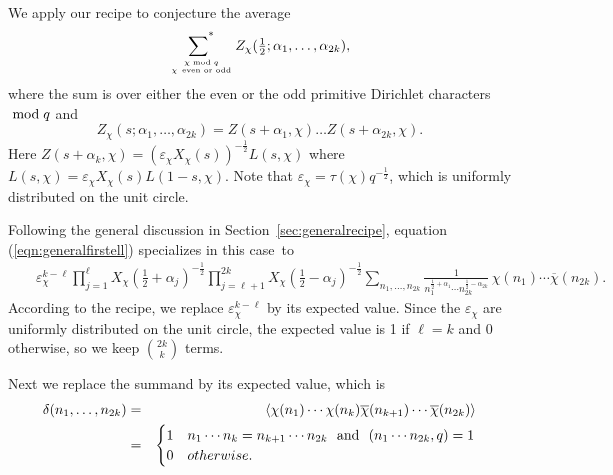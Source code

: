 \documentclass[12pt,letterpaper]{amsart}
\theoremstyle{plain}
\theoremstyle{definition}
\theoremstyle{remark}
\numberwithin{equation}{subsection}
\numberwithin{theorem}{subsection}
\numberwithin{table}{subsection}
\newcommand{\ontop}[2]{\genfrac{}{}{0pt}{}{#1}{#2}}
\renewcommand{\mod}{\bmod}
\def\sumstar{\operatornamewithlimits{\sum\nolimits^*}}
\begin{document}
We apply our recipe to conjecture the average
\begin{equation}
 \sumstar_{\ontop{\chi\mod q}{\chi\ \text{even or odd}}}
Z_\chi(\tfrac12;\alpha_1,\dots,\alpha_{2k}) ,
\end{equation}
where the sum is over either the even or the odd
 primitive Dirichlet characters $\mathstrut\mod q$
and
\begin{equation}
Z_\chi(s;\alpha_1,\dots,\alpha_{2k})=
 Z(s +\alpha_1,\chi)\dots
Z(s +\alpha_{2k},\chi)
.
\end{equation}
Here $Z(s +\alpha_k,\chi) = (\varepsilon_\chi X_\chi (s) )^{-\frac12} L(s, \chi)$
where $L(s, \chi)=\varepsilon_\chi X_\chi(s) L(1-s,\chi)$.
Note that $\varepsilon_\chi=\tau(\chi)q^{-\frac12}$,
which is uniformly distributed on the unit circle.

Following the general discussion in Section~\ref{sec:generalrecipe},
equation (\ref{eqn:generalfirstell}) specializes in this case~to
\begin{eqnarray}
&   & 
\varepsilon_\chi^{{k}-\ell} 
\prod_{j=1}^\ell {X}_\chi(\tfrac12 +\alpha_j)^{-\frac12}
\prod_{j=\ell+1}^{2k} {X}_\chi(\tfrac12 -\alpha_j)^{-\frac12}
\sum_{n_1,\dots, n_{2k}}
    \frac{1}{n_1^{\tfrac12 +\alpha_1}\cdots n_{2k}^{\tfrac12-\alpha_{2k}}}
\, 
\chi(n_1)\cdots \overline{\chi}(n_{2k})
.
 \end{eqnarray}
According to the recipe, we replace $\varepsilon_\chi^{{k}-\ell}$
by its expected value.  
Since the $\varepsilon_\chi$ are uniformly distributed on the unit circle,
the expected value is 1 if $\ell=k$ and 0 otherwise, so we keep
$\binom{2k}{k}$ terms.

Next we replace the summand by its expected value, which is
\begin{eqnarray}
\delta(n_1,\dots,n_{2k})
&=&
\langle \chi(n_1)\cdots\chi(n_k) 
         \overline{\chi}(n_{k+1})\cdots \overline{\chi}(n_{2k})\rangle \cr
&=&
\begin{cases}
1 & n_1\cdots n_k = n_{k+1} \cdots  n_{2k} \text{\ \ and\ \ } (n_1\cdots n_{2k},q)=1 \\
0 & otherwise .
\end{cases}
\end{eqnarray}
\end{document}
